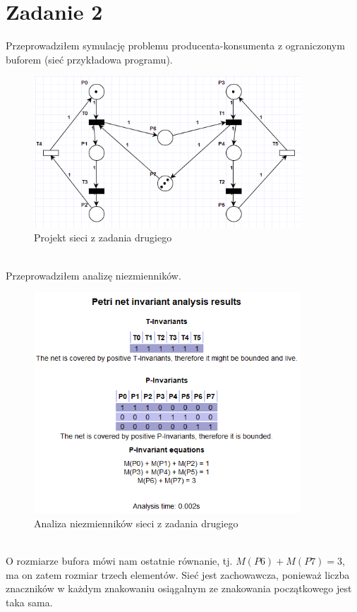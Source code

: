 \documentclass{article}
\begin{document}
    \newpage
    \section{Zadanie 2}
        Przeprowadziłem symulację problemu producenta-konsumenta z ograniczonym buforem (sieć przykładowa programu).
        \begin{figure}[h!]
            \centering
            \includegraphics[width=10cm]{lab6/n2.png}
            \caption{Projekt sieci z zadania drugiego}
        \end{figure}\\
        Przeprowadziłem analizę niezmienników.
        \begin{figure}[h!]
            \centering
            \includegraphics[width=10cm]{lab6/n2_1.png}
            \caption{Analiza niezmienników sieci z zadania drugiego}
        \end{figure}\\
        O rozmiarze bufora mówi nam ostatnie równanie, tj. $M(P6) + M(P7) = 3$, ma on zatem rozmiar trzech elementów.
        Sieć jest zachowawcza, ponieważ liczba znaczników w każdym znakowaniu osiągalnym ze znakowania początkowego jest taka sama.
\end{document}
